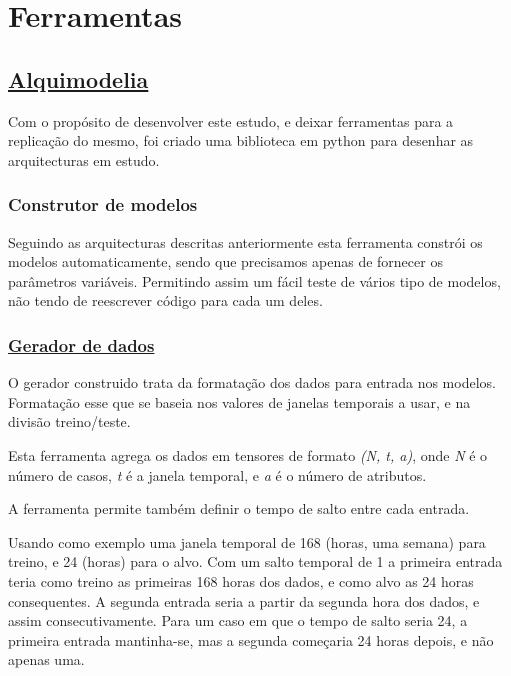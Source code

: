 \section{Ferramentas}

\subsection{\href{https://github.com/alquimodelia/alquimodelia}{Alquimodelia}\label{se:alquimodelia}}


Com o propósito de desenvolver este estudo, e deixar ferramentas para a replicação do mesmo, foi criado uma biblioteca em python para desenhar as arquitecturas em estudo.\par

\subsubsection{Construtor de modelos}

Seguindo as arquitecturas descritas anteriormente esta ferramenta constrói os modelos automaticamente, sendo que precisamos apenas de fornecer os parâmetros variáveis. Permitindo assim um fácil teste de vários tipo de modelos, não tendo de reescrever código para cada um deles.\par

\subsubsection{\href{https://github.com/alquimodelia/alquitable/blob/main/alquitable/generator.py}{Gerador de dados}}

O gerador construido trata da formatação dos dados para entrada nos modelos. Formatação esse que se baseia nos valores de janelas temporais a usar, e na divisão treino/teste.\par
Esta ferramenta agrega os dados em tensores de formato \textit{(N, t, a)}, onde \textit{N} é o número de casos, \textit{t} é a janela temporal, e \textit{a} é o número de atributos.\par
A ferramenta permite também definir o tempo de salto entre cada entrada.\par
Usando como exemplo uma janela temporal de 168 (horas, uma semana) para treino, e 24 (horas) para o alvo. Com um salto temporal de 1 a primeira entrada teria como treino as primeiras 168 horas dos dados, e como alvo as 24 horas consequentes. A segunda entrada seria a partir da segunda hora dos dados, e assim consecutivamente. Para um caso em que o tempo de salto seria 24, a primeira entrada mantinha-se, mas a segunda começaria 24 horas depois, e não apenas uma.\par

